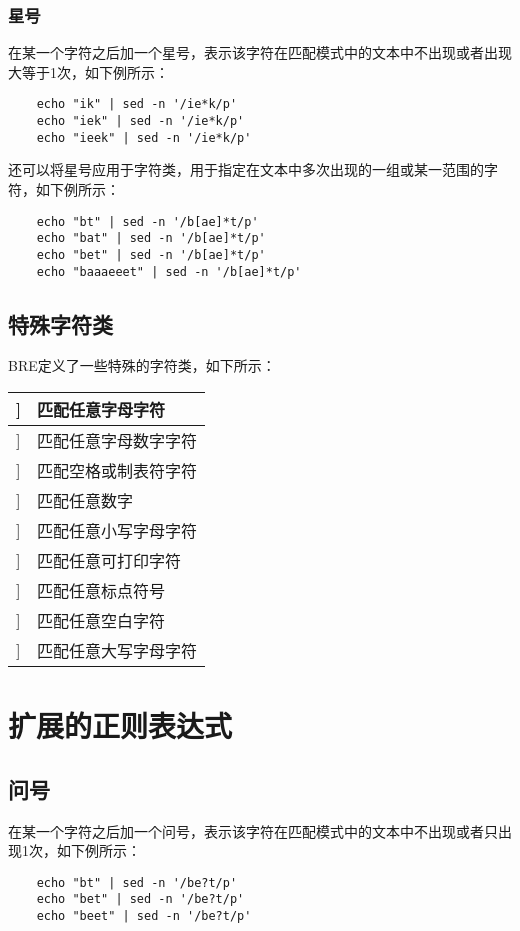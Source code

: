 \documentclass[a4paper,left=2.5cm,right=2.5cm,11pt]{article}
\begin{document}
\subsubsection{星号}
	在某一个字符之后加一个星号，表示该字符在匹配模式中的文本中不出现或者出现大等于1次，如下例所示：
	\begin{lstlisting}
	echo "ik" | sed -n '/ie*k/p'
	echo "iek" | sed -n '/ie*k/p'
	echo "ieek" | sed -n '/ie*k/p'
	\end{lstlisting}

	还可以将星号应用于字符类，用于指定在文本中多次出现的一组或某一范围的字符，如下例所示：
	\begin{lstlisting}
	echo "bt" | sed -n '/b[ae]*t/p'
	echo "bat" | sed -n '/b[ae]*t/p'
	echo "bet" | sed -n '/b[ae]*t/p'
	echo "baaaeeet" | sed -n '/b[ae]*t/p'
	\end{lstlisting}

\subsection{特殊字符类}
	BRE定义了一些特殊的字符类，如下所示：
	\begin{longtable}{p{2cm}p{5cm}}
	\hline
	[[:alpha:]] & 匹配任意字母字符 \\
	\hline
	[[:alnum:]] & 匹配任意字母数字字符 \\
	\hline
	[[:blank:]] & 匹配空格或制表符字符 \\
	\hline
	[[:digit:]] & 匹配任意数字 \\
	\hline
	[[:lower:]] & 匹配任意小写字母字符 \\
	\hline
	[[:print:]] & 匹配任意可打印字符 \\
	\hline
	[[:punct:]] & 匹配任意标点符号 \\
	\hline
	[[:space:]] & 匹配任意空白字符 \\
	\hline
	[[:upper:]] & 匹配任意大写字母字符 \\
	\hline
	\end{longtable}

\section{扩展的正则表达式}
\subsection{问号}
	在某一个字符之后加一个问号，表示该字符在匹配模式中的文本中不出现或者只出现1次，如下例所示：
	\begin{lstlisting}
	echo "bt" | sed -n '/be?t/p'
	echo "bet" | sed -n '/be?t/p'
	echo "beet" | sed -n '/be?t/p'
	\end{lstlisting}
\end{document}
